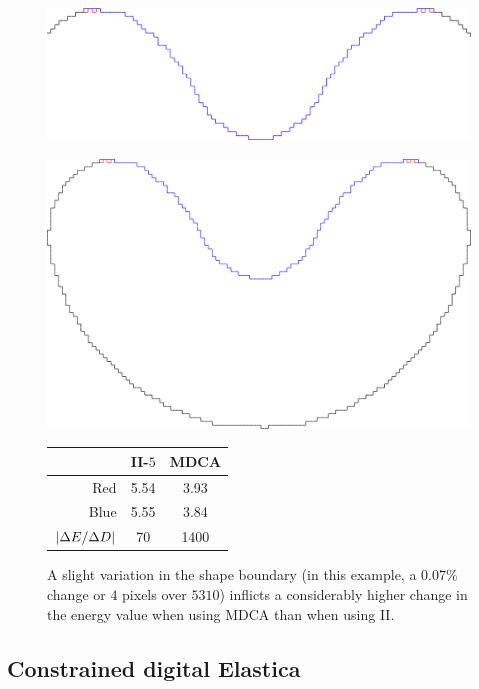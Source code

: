 \begin{figure}[]
\begin{minipage}[b]{0.6\textwidth}
\center
\includegraphics[scale=0.15]{figures/chapter5/mdca-sensitivity/closer-picture.pdf}
\end{minipage}%
\begin{minipage}[b]{0.4\textwidth}
\center
\includegraphics[scale=0.025]{figures/chapter5/mdca-sensitivity/big-picture.pdf}\\\vspace{2em}
\captionsetup{type=table}
\begin{tabular}{r|c|c}
& II-$5$ & MDCA \\
\hline
Red  & 5.54 & 3.93\\
Blue & 5.55 & 3.84\\
\hline
$| \Delta E / \Delta D |$ & 70 & 1400
\end{tabular}
\end{minipage}
\caption{A slight variation in the shape boundary (in this example, a $0.07\%$ change or $4$ pixels over $5310$) inflicts a considerably higher change in the energy value when using MDCA than when using II. }
\label{fig:mdca-sensitivity}
\end{figure}

\subsection{Constrained digital Elastica}
\label{ch6:subsec:constrained-digital-elastica}

